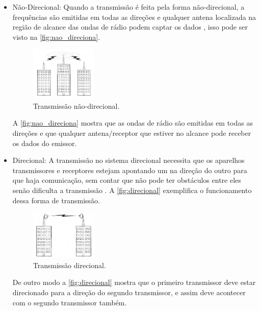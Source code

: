         \begin{itemize}
        \item{Não-Direcional: }
        Quando a transmissão é feita pela forma não-direcional, a frequências são emitidas em todas as direções e qualquer antena localizada na região de alcance das ondas de rádio podem captar os dados \cite{torres2001}, isso pode ser visto na \autoref{fig:nao_direciona}.
            \begin{figure}[H]
              \caption{\label{fig:nao_direciona}{Transmissão não-direcional.}}
              \centering
              \includegraphics[width=0.3\textwidth]{Figuras/transmissao_radio_nao_direcional.PNG}
            \end{figure}
        \par
        A  \autoref{fig:nao_direciona} mostra que as ondas de rádio são emitidas em todas as direções e que qualquer antena/receptor que estiver no alcance pode receber os dados do emissor.
        
        \item{Direcional: }
        A transmissão no sistema direcional necessita que os aparelhos transmissores e receptores estejam apontando um na direção do outro para que haja comunicação, sem contar que não pode ter obstáculos entre eles senão dificulta a transmissão \cite{torres2001}. A \autoref{fig:direcional} exemplifica o funcionamento dessa forma de transmissão.

        \begin{figure}[H]
              \caption{\label{fig:direcional}{Transmissão direcional.}}
              \centering
              \includegraphics[width=0.3\textwidth]{Figuras/transmissao_radio_direcional.PNG}
        \end{figure}
        \par
        De outro modo a \autoref{fig:direcional} mostra que o primeiro transmissor deve estar direcionado para a direção do segundo transmissor, e assim deve acontecer com o segundo transmissor também.
        \end{itemize}    
